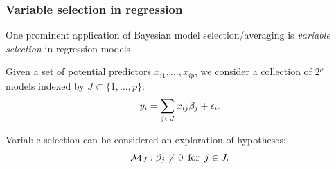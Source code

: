 \documentclass[18pt]{beamer}
\newcommand{\defineTightSpacing}{%
	\setlength{\abovedisplayskip}{.25\baselineskip}%
	\setlength{\belowdisplayskip}{.25\baselineskip}%
}
\newcommand{\nPred}{p}
\newcommand{\model}{\mathcal{M}}
\newcommand{\nonzeroCoefSet}{J}
\begin{document}
\begin{frame}
\frametitle{Variable selection in regression}
One prominent application of Bayesian model selection/averaging is \textit{variable selection} in regression models.

\pause
\smallskip
Given a set of potential predictors $x_{i1}, \ldots, x_{i\nPred}$, we consider a collection of $2^\nPred$ models indexed by $\nonzeroCoefSet \subset \{1, \ldots, \nPred\}$:
\begin{equation*} \defineTightSpacing%
y_i = \sum_{j \in \nonzeroCoefSet} x_{ij} \beta_j + \epsilon_i.
\end{equation*}

\pause
Variable selection can be considered an exploration of hypotheses:
\begin{equation*} \defineTightSpacing%
\model_\nonzeroCoefSet: \beta_j \neq 0
	\, \text{ for } \, j \in \nonzeroCoefSet.
\end{equation*}
\end{frame}
\end{document}
